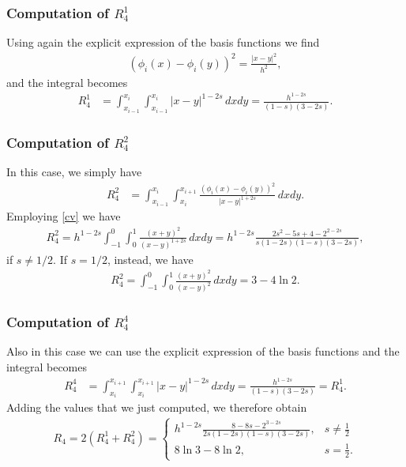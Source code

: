 \subsubsection*{Computation of $R_4^1$}
Using again the explicit expression of the basis functions we find 
\begin{align*}
	(\phi_i(x)-\phi_i(y))^2 = \frac{|x-y|^2}{h^2},
\end{align*}
and the integral becomes
\begin{align*}
	R_4^1 &= \int_{x_{i-1}}^{x_i}\int_{x_{i-1}}^{x_i} |x-y|^{1-2s}\,dxdy = \frac{h^{1-2s}}{(1-s)(3-2s)}. 
\end{align*}

\subsubsection*{Computation of $R_4^2$}
In this case, we simply have
\begin{align*}
	R_4^2 &= \int_{x_{i-1}}^{x_i}\int_{x_i}^{x_{i+1}} \frac{(\phi_i(x)-\phi_i(y))^2}{|x-y|^{1+2s}}\,dxdy.
\end{align*}
Employing \eqref{cv} we have
\begin{align*}
	R_4^2 = h^{1-2s}\int_{-1}^0\int_0^1 \frac{(x+y)^2}{(x-y)^{1+2s}}\,dxdy = h^{1-2s}\frac{2s^2-5s+4-2^{2-2s}}{s(1-2s)(1-s)(3-2s)}, 
\end{align*}
if $s\neq 1/2$. If $s=1/2$, instead, we have
\begin{align*}
	R_4^2 = \int_{-1}^0\int_0^1 \frac{(x+y)^2}{(x-y)^2}\,dxdy = 3-4\ln 2.
\end{align*}
\subsubsection*{Computation of $R_4^4$}
Also in this case we can use the explicit expression of the basis functions and the integral becomes
\begin{align*}
	R_4^4 &= \int_{x_i}^{x_{i+1}}\int_{x_i}^{x_{i+1}} |x-y|^{1-2s}\,dxdy = \frac{h^{1-2s}}{(1-s)(3-2s)}=R_4^1. 
\end{align*}
Adding the values that we just computed, we therefore obtain
\begin{align}\label{R4}
	R_4 = 2(R_4^1+R_4^2) = \begin{cases}
					\displaystyle h^{1-2s}\frac{8-8s-2^{3-2s}}{2s(1-2s)(1-s)(3-2s)}, & \displaystyle s\neq \frac{1}{2}
					\\
					8\ln 3-8\ln 2, & \displaystyle s=\frac{1}{2}.
				\end{cases}	
\end{align}

